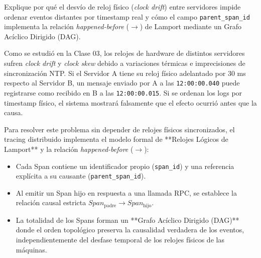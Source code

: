 \documentclass[variant=guia,cover=institutional,mode=screen]{ua-engineering-v6-article}
\begin{document}
\begin{uaexercise}
Explique por qué el desvío de reloj físico (\emph{clock drift}) entre servidores impide ordenar eventos distantes por timestamp real y cómo el campo \texttt{parent\_span\_id} implementa la relación \emph{happened-before} ($\rightarrow$) de Lamport mediante un Grafo Acíclico Dirigido (DAG).
\end{uaexercise}
\begin{uaanswer}
Como se estudió en la Clase 03, los relojes de hardware de distintos servidores sufren \emph{clock drift} y \emph{clock skew} debido a variaciones térmicas e imprecisiones de sincronización NTP.
Si el Servidor A tiene su reloj físico adelantado por 30 ms respecto al Servidor B, un mensaje enviado por A a las \texttt{12:00:00.040} puede registrarse como recibido en B a las \texttt{12:00:00.015}. Si se ordenan los logs por timestamp físico, el sistema mostrará falsamente que el efecto ocurrió antes que la causa.

Para resolver este problema sin depender de relojes físicos sincronizados, el tracing distribuido implementa el modelo formal de **Relojes Lógicos de Lamport** y la relación \emph{happened-before} ($\rightarrow$):
\begin{itemize}
\item Cada Span contiene un identificador propio (\texttt{span\_id}) y una referencia explícita a su causante (\texttt{parent\_span\_id}).
\item Al emitir un Span hijo en respuesta a una llamada RPC, se establece la relación causal estricta $Span_{\text{padre}} \rightarrow Span_{\text{hijo}}$.
\item La totalidad de los Spans forman un **Grafo Acíclico Dirigido (DAG)** donde el orden topológico preserva la causalidad verdadera de los eventos, independientemente del desfase temporal de los relojes físicos de las máquinas.
\end{itemize}
\end{uaanswer}
\end{document}
